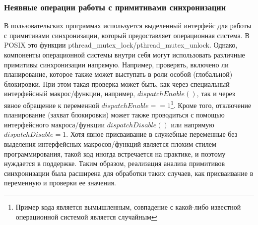 \subsubsection{Неявные операции работы с примитивами синхронизации}
В пользовательских программах используется выделенный интерфейс для работы с примитивами синхронизации, который предоставляет операционная система.
В POSIX это функции pthread\_mutex\_lock/pthread\_mutex\_unlock. 
Однако, компоненты операционной системы внутри себя могут использовать различные примитивы синхронизации напрямую.
Например, проверять, включено ли планирование, которое также может выступать в роли особой (глобальной) блокировки.
При этом такая проверка может быть, как через специальный интерфейсный макрос/функции, например, $dispatchEnable()$, так и через явное обращение к переменной $dispatchEnable == 1$\footnote{Пример кода является вымышленным, совпадение с какой-либо известной операционной системой является случайным}.
Кроме того, отключение планирование (захват блокировки) может также проводиться с помощью интерфейсного макроса/функции $dispatchDisable()$ или напрямую $dispatchDisable = 1$.
Хотя явное присваивание в служебные переменные без выделения интерфейсных макросов/функций является плохим стилем программирования, такой код иногда встречается на практике, и поэтому нуждается в поддержке.
Таким образом, реализация анализа примитивов синхронизации была расширена для обработки таких случаев, как присваивание в переменную и проверки ее значения.

